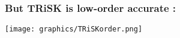 \begin{frame}
\frametitle{But TRiSK is low-order accurate \frownie:}

\texttt{[image: graphics/TRiSKorder.png]}

\end{frame}

